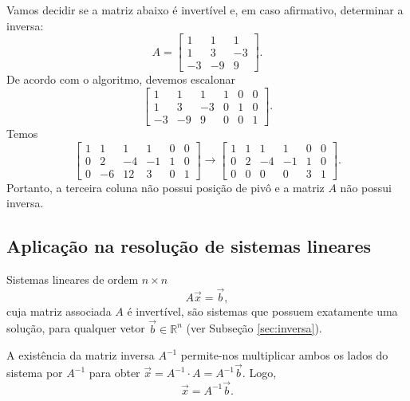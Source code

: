 \documentclass[../livro.tex]{subfiles}  %
\begin{document}
\begin{example}
	Vamos decidir se a matriz abaixo é invertível e, em caso afirmativo, determinar a inversa:
	\begin{equation}
	A =
	\left[
	\begin{array}{cccc}
	1 & 1 & 1  \\
	1 & 3 & -3  \\
	-3 & -9 & 9  
	\end{array}
	\right].
	\end{equation} De acordo com o algoritmo, devemos escalonar
	\begin{equation}
	\left[
	\begin{array}{ccc|ccc}
	1 & 1 & 1 & 1 & 0 & 0  \\
	1 & 3 & -3 & 0 & 1 & 0  \\
	-3 & -9 & 9  & 0 & 0 & 1 
	\end{array}
	\right].
	\end{equation} Temos
	\begin{equation}
	\left[
	\begin{array}{ccc|ccc}
	1 & 1 & 1 & 1 & 0 & 0  \\
	0 & 2 & -4 & -1 & 1 & 0  \\
	0 & -6 & 12  & 3 & 0 & 1 
	\end{array}
	\right] \to
	\left[
	\begin{array}{ccc|ccc}
	1 & 1 & 1 & 1 & 0 & 0  \\
	0 & 2 & -4 & -1 & 1 & 0  \\
	0 & 0 & 0  & 0 & 3 & 1 
	\end{array}
	\right].
	\end{equation} Portanto, a terceira coluna não possui posição de pivô e a matriz $A$ não possui inversa.
\end{example}


\subsection{Aplicação na resolução de sistemas lineares}


Sistemas lineares de ordem $n \times n$
\begin{equation}
A \vec{x} = \vec{b},
\end{equation} cuja matriz associada $A$ é invertível, são sistemas que possuem exatamente uma solução, para qualquer vetor $\vec{b} \in \mathbb{R}^n$ (ver Subseção \ref{sec:inversa}).

A existência da matriz inversa $A^{-1}$ permite-nos multiplicar ambos os lados do sistema por $A^{-1}$ para obter $\vec{x} = A^{-1} \cdot A = A^{-1} \vec{b}.$ Logo,
\begin{equation}
\boxed{\vec{x} = A^{-1} \vec{b}.}
\end{equation}
\end{document}
